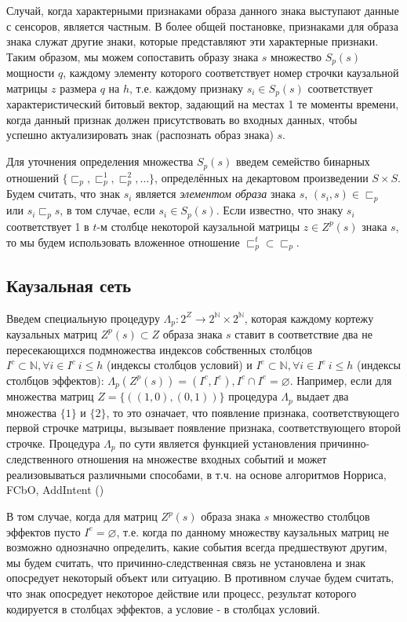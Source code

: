 \documentclass[12pt]{scrartcl}
\begin{document}
	Случай, когда характерными признаками образа данного знака выступают данные с сенсоров, является частным. В более общей постановке, признаками для образа знака служат другие знаки, которые представляют эти характерные признаки. Таким образом, мы можем сопоставить образу знака $s$ множество $S_p(s)$ мощности $q$, каждому элементу которого соответствует номер строчки каузальной матрицы $z$ размера $q$ на $h$, т.е. каждому признаку $s_i\in S_p(s)$ соответствует характеристический битовый вектор, задающий на местах 1 те моменты времени, когда данный признак должен присутствовать во входных данных, чтобы успешно актуализировать знак (распознать образ знака) $s$. 
	
	Для уточнения определения множества $S_p(s)$ введем семейство бинарных отношений $\{\sqsubset_p,\sqsubset_p^1,\sqsubset_p^2,\dots\}$, определённых на декартовом произведении $S\times S$. Будем считать, что знак $s_i$ является \textit{элементом образа} знака $s$, $(s_i,s)\in\sqsubset_p$ или $s_i\sqsubset_p s$, в том случае, если $s_i\in S_p(s)$. Если известно, что знаку $s_i$ соответствует 1 в $t$-м столбце некоторой каузальной матрицы $z\in Z^p(s)$ знака $s$, то мы будем использовать вложенное отношение $\sqsubset_p^t\subset \sqsubset_p$.

	\subsection{Каузальная сеть} \label{subsec:causal_net}
	
	Введем специальную процедуру $\Lambda_p: 2^Z\rightarrow 2^{\mathbb N}\times 2^{\mathbb N}$, которая каждому кортежу каузальных матриц $Z^p(s)\subset Z$ образа знака $s$ ставит в соответствие два не пересекающихся подмножества индексов собственных столбцов $I^c\subset\mathbb N, \forall i\in I^c\ i\leq h$ (индексы столбцов условий) и $I^e\subset\mathbb N, \forall i\in I^e\ i\leq h$ (индексы столбцов эффектов): $\Lambda_p(Z^p(s))=(I^c,I^e), I^c\cap I^e=\varnothing$. Например, если для множества матриц $Z=\{((1, 0), (0, 1))\}$ процедура $\Lambda_p$ выдает два множества $\{1\}$ и $\{2\}$, то это означает, что появление признака, соответствующего первой строчке матрицы, вызывает появление признака, соответствующего второй строчке. Процедура $\Lambda_p$ по сути является функцией установления причинно-следственного отношения на множестве входных событий и может реализовываться различными способами, в т.ч. на основе алгоритмов Норриса, FCbO, AddIntent (\cite{Norris1978,Krajca2010,Merwe2004})

	В том случае, когда для матриц $Z^p(s)$ образа знака $s$ множество столбцов эффектов пусто $I^e=\varnothing$, т.е. когда по данному множеству каузальных матриц не возможно однозначно определить, какие события всегда предшествуют другим, мы будем считать, что причинно-следственная связь не установлена и знак опосредует некоторый объект или ситуацию. В противном случае будем считать, что знак опосредует некоторое действие или процесс, результат которого кодируется в столбцах эффектов, а условие - в столбцах условий. 
\end{document}
